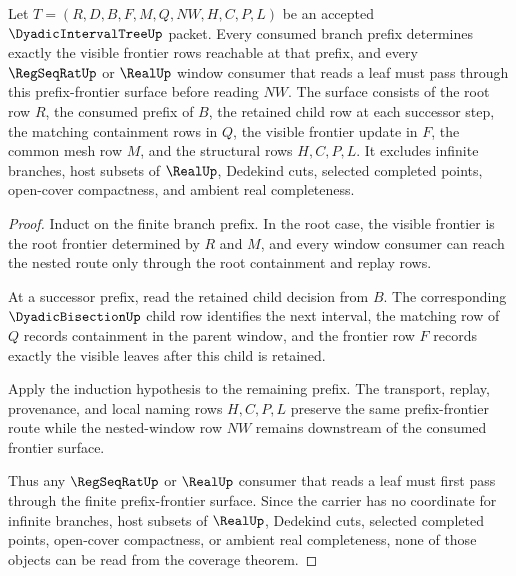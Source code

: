 \begin{theorem}
\label{thm:dyadic-interval-tree-prefix-frontier-coverage}
Let $T=(R,D,B,F,M,Q,NW,H,C,P,L)$ be an accepted $\DyadicIntervalTreeUp$ packet. Every consumed branch prefix determines exactly the visible frontier rows reachable at that prefix, and every $\RegSeqRatUp$ or $\RealUp$ window consumer that reads a leaf must pass through this prefix-frontier surface before reading $NW$. The surface consists of the root row $R$, the consumed prefix of $B$, the retained child row at each successor step, the matching containment rows in $Q$, the visible frontier update in $F$, the common mesh row $M$, and the structural rows $H,C,P,L$. It excludes infinite branches, host subsets of $\RealUp$, Dedekind cuts, selected completed points, open-cover compactness, and ambient real completeness.
\end{theorem}
\begin{proof}
Induct on the finite branch prefix. In the root case, the visible frontier is the root frontier determined by $R$ and $M$, and every window consumer can reach the nested route only through the root containment and replay rows.

At a successor prefix, read the retained child decision from $B$. The corresponding $\DyadicBisectionUp$ child row identifies the next interval, the matching row of $Q$ records containment in the parent window, and the frontier row $F$ records exactly the visible leaves after this child is retained.

Apply the induction hypothesis to the remaining prefix. The transport, replay, provenance, and local naming rows $H,C,P,L$ preserve the same prefix-frontier route while the nested-window row $NW$ remains downstream of the consumed frontier surface.

Thus any $\RegSeqRatUp$ or $\RealUp$ consumer that reads a leaf must first pass through the finite prefix-frontier surface. Since the carrier has no coordinate for infinite branches, host subsets of $\RealUp$, Dedekind cuts, selected completed points, open-cover compactness, or ambient real completeness, none of those objects can be read from the coverage theorem.
\end{proof}

